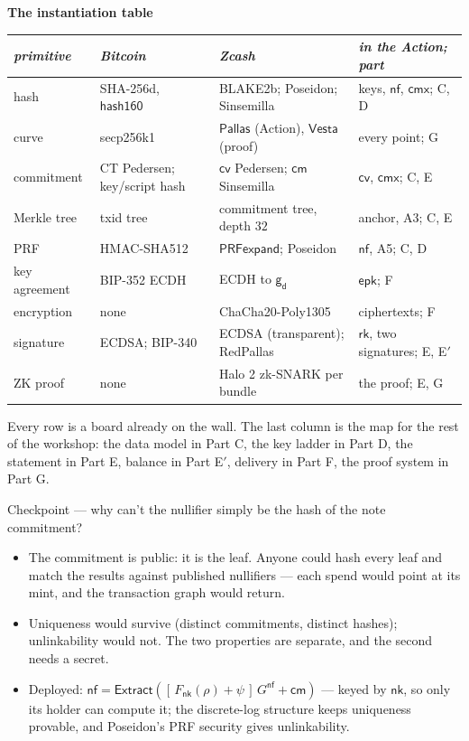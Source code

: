 \documentclass[11pt]{article}
\newcommand{\Pallas}{\ensuremath{\mathsf{Pallas}}}
\newcommand{\Vesta}{\ensuremath{\mathsf{Vesta}}}
\newcommand{\nfsym}{\ensuremath{\mathsf{nf}}}
\newcommand{\cmsym}{\ensuremath{\mathsf{cm}}}
\newcommand{\cmx}{\ensuremath{\mathsf{cmx}}}
\newcommand{\cvsym}{\ensuremath{\mathsf{cv}}}
\newcommand{\rksym}{\ensuremath{\mathsf{rk}}}
\newcommand{\gd}{\ensuremath{\mathsf{g_d}}}
\newcommand{\nksym}{\ensuremath{\mathsf{nk}}}
\newcommand{\epk}{\ensuremath{\mathsf{epk}}}
\newcommand{\Extract}{\ensuremath{\mathsf{Extract}}}
\newcounter{board}
\newenvironment{board}[2]{\clearpage\stepcounter{board}%
  \sbox{\bdlabel}{\small\color{arbdim}#2}%
  \noindent\parbox[b]{\dimexpr\textwidth-\wd\bdlabel-1em\relax}{\raggedright
    \color{arb}\large\bfseries #1}\hfill\usebox{\bdlabel}\par
  \vspace{2pt}{\color{arb!40}\hrule}\vspace{4pt}}{\par}
\newcommand{\shead}[1]{\par\smallskip{\small\bfseries\color{arbdim}#1}\par\nopagebreak}
\newcommand{\Write}{\shead{Write}}
\newcommand{\Say}{\shead{Say}}
\newcommand{\Ask}{\shead{Ask}}
\newcommand{\Answer}{\clearpage\shead{Answer}}
\begin{document}
\begin{board}{The instantiation table}{all four}
\Write
{\small\setlength{\tabcolsep}{3pt}
\begin{tabular}{@{}lp{29mm}p{45mm}p{40mm}@{}}
  \toprule
  \emph{primitive} & \emph{Bitcoin} & \emph{Zcash}
    & \emph{in the Action; part} \tabularnewline
  \midrule
  hash & SHA-256d, $\mathsf{hash160}$
    & \raggedright BLAKE2b; Poseidon; Sinsemilla
    & keys, $\nfsym$, $\cmx$; C, D \tabularnewline
  curve & secp256k1 & \Pallas{} (Action), \Vesta{} (proof)
    & every point; G \tabularnewline
  commitment & \raggedright CT Pedersen; key/script hash
    & $\cvsym$ Pedersen; $\cmsym$ Sinsemilla
    & $\cvsym$, $\cmx$; C, E \tabularnewline
  Merkle tree & txid tree & commitment tree, depth $32$
    & anchor, A3; C, E \tabularnewline
  PRF & HMAC-SHA512 & $\mathsf{PRFexpand}$; Poseidon
    & $\nfsym$, A5; C, D \tabularnewline
  key agreement & BIP-352 ECDH & ECDH to $\gd$ & $\epk$; F \tabularnewline
  encryption & none & ChaCha20-Poly1305
    & ciphertexts; F \tabularnewline
  signature & ECDSA; BIP-340 & \raggedright ECDSA (transparent); RedPallas
    & \raggedright $\rksym$, two signatures; E, E$'$ \tabularnewline
  ZK proof & none & \raggedright Halo 2 zk-SNARK per bundle
    & the proof; E, G \tabularnewline
  \bottomrule
\end{tabular}}
\Say
Every row is a board already on the wall. The last column is the map for
the rest of the workshop: the data model in Part C, the key ladder in
Part D, the statement in Part E, balance in Part E$'$, delivery in Part
F, the proof system in Part G.
\Ask
Checkpoint --- why can't the nullifier simply be the hash of the note
commitment?
\Answer
\begin{itemize}
  \item The commitment is public: it is the leaf. Anyone could hash every
    leaf and match the results against published nullifiers --- each
    spend would point at its mint, and the transaction graph would return.
  \item Uniqueness would survive (distinct commitments, distinct hashes);
    unlinkability would not. The two properties are separate, and the
    second needs a secret.
  \item Deployed: $\nfsym = \Extract([\,F_{\nksym}(\rho) + \psi\,]\,
    G^{\mathsf{nf}} + \cmsym)$ --- keyed by $\nksym$, so only its holder
    can compute it; the discrete-log structure keeps uniqueness provable,
    and Poseidon's PRF security gives unlinkability.
\end{itemize}
\end{board}
\end{document}
